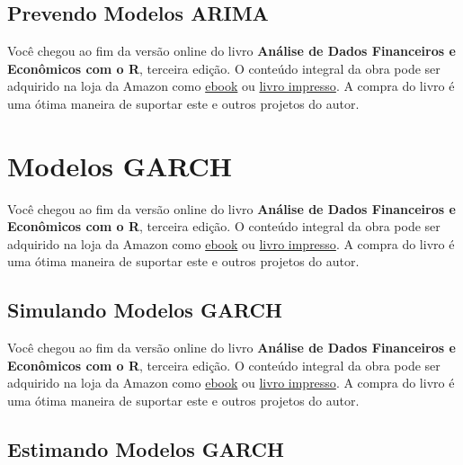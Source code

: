 \documentclass[
  11pt,
]{book}
\newenvironment{pleasebuyit}
{\begin{noteblock}
		
	} {\end{noteblock}}
\begin{document}
\hypertarget{prevendo-modelos-arima}{%
\subsection{Prevendo Modelos ARIMA}\label{prevendo-modelos-arima}}

\begin{pleasebuyit}
Você chegou ao fim da versão online do livro \textbf{Análise de Dados
Financeiros e Econômicos com o R}, terceira edição. O conteúdo integral
da obra pode ser adquirido na loja da Amazon como
\href{https://www.amazon.com.br/dp/B08WNC27ZY}{ebook} ou
\href{https://www.amazon.com/dp/B08WP8CCDB}{livro impresso}. A compra do
livro é uma ótima maneira de suportar este e outros projetos do autor.
\end{pleasebuyit}

\hypertarget{modelos-garch}{%
\section{Modelos GARCH}\label{modelos-garch}}

\begin{pleasebuyit}
Você chegou ao fim da versão online do livro \textbf{Análise de Dados
Financeiros e Econômicos com o R}, terceira edição. O conteúdo integral
da obra pode ser adquirido na loja da Amazon como
\href{https://www.amazon.com.br/dp/B08WNC27ZY}{ebook} ou
\href{https://www.amazon.com/dp/B08WP8CCDB}{livro impresso}. A compra do
livro é uma ótima maneira de suportar este e outros projetos do autor.
\end{pleasebuyit}

\hypertarget{simulando-modelos-garch}{%
\subsection{Simulando Modelos GARCH}\label{simulando-modelos-garch}}

\begin{pleasebuyit}
Você chegou ao fim da versão online do livro \textbf{Análise de Dados
Financeiros e Econômicos com o R}, terceira edição. O conteúdo integral
da obra pode ser adquirido na loja da Amazon como
\href{https://www.amazon.com.br/dp/B08WNC27ZY}{ebook} ou
\href{https://www.amazon.com/dp/B08WP8CCDB}{livro impresso}. A compra do
livro é uma ótima maneira de suportar este e outros projetos do autor.
\end{pleasebuyit}

\hypertarget{estimating-garch}{%
\subsection{Estimando Modelos GARCH}\label{estimating-garch}}
\end{document}
